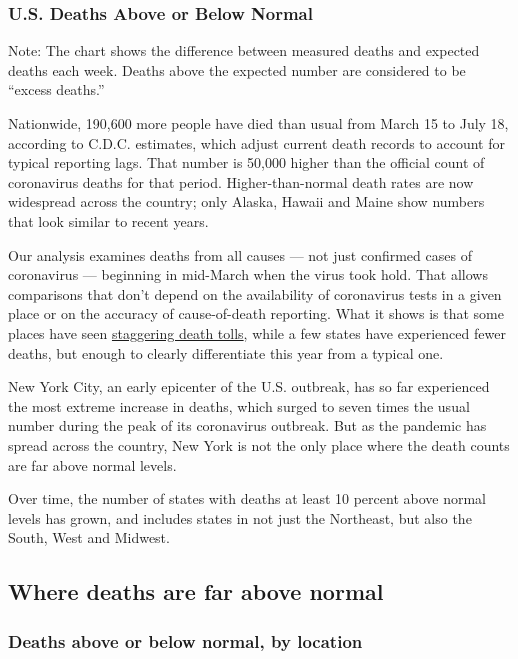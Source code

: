 \hypertarget{us-deaths-above-or-below-normal}{%
\subsubsection{U.S. Deaths Above or Below
Normal}\label{us-deaths-above-or-below-normal}}

Note: The chart shows the difference between measured deaths and
expected deaths each week. Deaths above the expected number are
considered to be ``excess deaths.''

Nationwide, 190,600 more people have died than usual from March 15 to
July 18, according to C.D.C. estimates, which adjust current death
records to account for typical reporting lags. That number is 50,000
higher than the official count of coronavirus deaths for that period.
Higher-than-normal death rates are now widespread across the country;
only Alaska, Hawaii and Maine show numbers that look similar to recent
years.

Our analysis examines deaths from all causes --- not just confirmed
cases of coronavirus --- beginning in mid-March when the virus took
hold. That allows comparisons that don't depend on the availability of
coronavirus tests in a given place or on the accuracy of cause-of-death
reporting. What it shows is that some places have seen
\href{https://www.nytimes.com/interactive/2020/04/27/upshot/coronavirus-deaths-new-york-city.html}{staggering
death tolls}, while a few states have experienced fewer deaths, but
enough to clearly differentiate this year from a typical one.

New York City, an early epicenter of the U.S. outbreak, has so far
experienced the most extreme increase in deaths, which surged to seven
times the usual number during the peak of its coronavirus outbreak. But
as the pandemic has spread across the country, New York is not the only
place where the death counts are far above normal levels.

Over time, the number of states with deaths at least 10 percent above
normal levels has grown, and includes states in not just the Northeast,
but also the South, West and Midwest.

\hypertarget{where-deaths-are-far-above-normal}{%
\subsection{Where deaths are far above
normal}\label{where-deaths-are-far-above-normal}}

\hypertarget{deaths-above-or-below-normal-by-location}{%
\subsubsection{Deaths above or below normal, by
location}\label{deaths-above-or-below-normal-by-location}}

